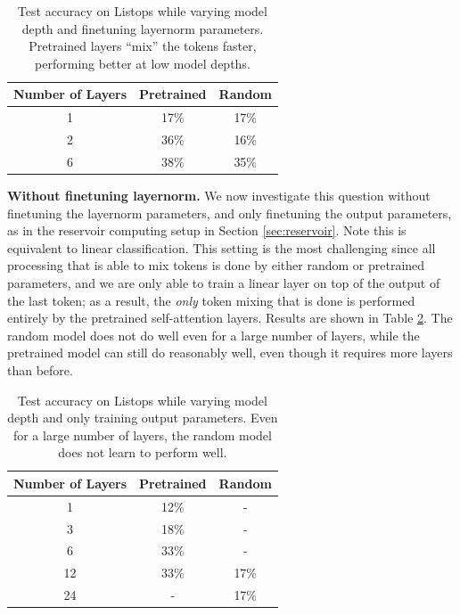 \begin{table}[h] 
\begin{center}
\begin{tabular}{c|cc}
\toprule
\textbf{Number of Layers} & \multicolumn{1}{c}{\bf Pretrained} & \multicolumn{1}{c}{\bf Random} \\
\midrule
1 & 17\% & 17\% \\
2 & 36\% & 16\% \\
6 & 38\% & 35\% \\
\bottomrule
\end{tabular}
\end{center}
\caption{Test accuracy on Listops while varying model depth and finetuning layernorm parameters. Pretrained layers ``mix'' the tokens faster, performing better at low model depths.}\label{table:depth_ln}
\end{table}

\textbf{Without finetuning layernorm.}
We now investigate this question without finetuning the layernorm parameters, and only finetuning the output parameters, as in the reservoir computing setup in Section \ref{sec:reservoir}.
Note this is equivalent to linear classification.
This setting is the most challenging since all processing that is able to mix tokens is done by either random or pretrained parameters, and we are only able to train a linear layer on top of the output of the last token; as a result, the \emph{only} token mixing that is done is performed entirely by the pretrained self-attention layers.
Results are shown in Table \ref{table:depth_no_ln}.
The random model does not do well even for a large number of layers, while the pretrained model can still do reasonably well, even though it requires more layers than before.

\begin{table}[h] 
\begin{center}
\begin{tabular}{c|cc}
\toprule
\textbf{Number of Layers} & \multicolumn{1}{c}{\bf Pretrained} & \multicolumn{1}{c}{\bf Random} \\
\midrule
1 & 12\% & - \\
3 & 18\% & - \\
6 & 33\% & - \\
12 & 33\% & 17\% \\
24 & - & 17\% \\
\bottomrule
\end{tabular}
\end{center}
\caption{Test accuracy on Listops while varying model depth and only training output parameters. Even for a large number of layers, the random model does not learn to perform well.}\label{table:depth_no_ln}
\end{table}


